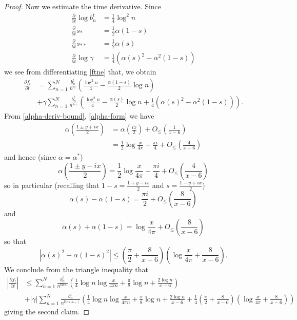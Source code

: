 \documentclass[a4paper,11pt,twoside]{amsart}
\begin{document}
\begin{proof}
Now we estimate the time derivative.  Since
\begin{align*}
 \frac{\partial}{\partial t} \log b_n^t &= \frac{1}{4} \log^2 n \\
 \frac{\partial}{\partial t} s_* &= \frac{1}{2} \alpha(1-s) \\
 \frac{\partial}{\partial t} s_{**} &= \frac{1}{2} \alpha(s) \\
 \frac{\partial}{\partial t} \log \gamma &= \frac{1}{4} \left(\alpha(s)^2 - \alpha^2(1-s)\right)
\end{align*}
we see from differentiating \eqref{ftne} that, we obtain
\begin{align*}
 \frac{\partial f_t}{\partial t} &= \sum_{n=1}^N \frac{b_n^t}{n^{s_*}} \left(\frac{\log^2 n}{4} - \frac{\alpha(1-s)}{2} \log n\right) \\
&+ \gamma \sum_{n=1}^N \frac{b_n^t}{n^{s_{**}}}
\left(\frac{\log^2 n}{4} - \frac{\alpha(s)}{2} \log n + \frac{1}{4} (\alpha(s)^2 - \alpha^2(1-s))\right).
\end{align*}
From \eqref{alpha-deriv-bound}, \eqref{alpha-form} we have
\begin{align*}
 \alpha\left(\frac{1 \pm y+ix}{2}\right) &= \alpha\left(\frac{ix}{2}\right) + O_{\leq}\left( \frac{1}{x-6} \right) \\
&= \frac{1}{2} \log \frac{x}{4\pi} + \frac{\pi i}{4} + O_{\leq}\left( \frac{4}{x-6} \right) 
\end{align*}
and hence (since $\alpha = \alpha^*$)
$$ \alpha\left(\frac{1 \pm y-ix}{2}\right) = \frac{1}{2} \log \frac{x}{4\pi} - \frac{\pi i}{4} + O_{\leq}\left( \frac{4}{x-6} \right) $$
so in particular (recalling that $1-s = \frac{1+y-ix}{2}$ and $s = \frac{1-y+ix}{2}$)
$$ \alpha(s) - \alpha(1-s) = \frac{\pi i}{2} + O_{\leq}\left( \frac{8}{x-6} \right)$$
and
$$ \alpha(s) + \alpha(1-s) = \log \frac{x}{4\pi} + O_{\leq}\left( \frac{8}{x-6} \right)$$
so that
$$ \left|\alpha(s)^2 - \alpha(1-s)^2\right| \leq \left(\frac{\pi}{2} + \frac{8}{x-6}\right) \left(\log \frac{x}{4\pi} + \frac{8}{x-6}\right).$$
We conclude from the triangle inequality that
\begin{align*}
 \left|\frac{\partial f_t}{\partial t}\right| &\leq \sum_{n=1}^N \frac{b_n^t}{n^{\mathrm{Re} s_*}} \left(\frac{1}{4} \log n \log \frac{x}{4\pi n} + \frac{\pi}{8} \log n + \frac{2 \log n}{x-6}\right) \\
&+ |\gamma| \sum_{n=1}^N \frac{b_n^t}{n^{\mathrm{Re}(s_{**})}}
\left(\frac{1}{4} \log n \log \frac{x}{4\pi n} + \frac{\pi}{8} \log n + \frac{2 \log n}{x-6} + \frac{1}{4} \left(\frac{\pi}{2} + \frac{8}{x-6}\right) \left(\log \frac{x}{4\pi} + \frac{8}{x-6}\right)\right)
\end{align*}
giving the second claim.
\end{proof}
\end{document}
